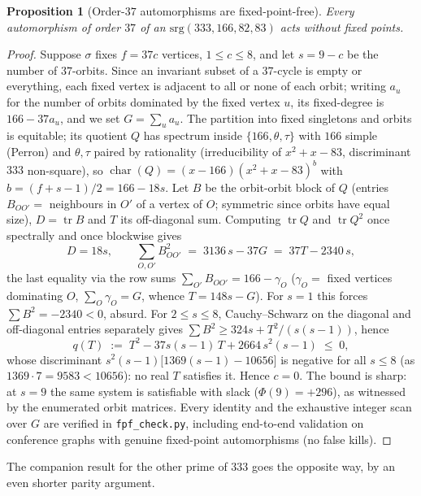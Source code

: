 \documentclass[11pt]{article}
\newtheorem{proposition}{Proposition}
\theoremstyle{definition}
\begin{document}
\begin{proposition}[Order-$37$ automorphisms are fixed-point-free]\label{prop:fpf}
Every automorphism of order $37$ of an $\mathrm{srg}(333,166,82,83)$ acts without fixed points.
\end{proposition}
\begin{proof}
Suppose $\sigma$ fixes $f=37c$ vertices, $1\le c\le 8$, and let $s=9-c$ be the number of
$37$-orbits. Since an invariant subset of a $37$-cycle is empty or everything, each fixed vertex is
adjacent to all or none of each orbit; writing $a_u$ for the number of orbits dominated by the fixed
vertex $u$, its fixed-degree is $166-37a_u$, and we set $G=\sum_u a_u$. The partition into fixed
singletons and orbits is equitable; its quotient $Q$ has spectrum inside
$\{166,\theta,\tau\}$ with $166$ simple (Perron) and $\theta,\tau$ paired by rationality
(irreducibility of $x^2+x-83$, discriminant $333$ non-square), so
$\operatorname{char}(Q)=(x-166)(x^2+x-83)^{b}$ with $b=(f+s-1)/2=166-18s$. Let $B$ be the
orbit-orbit block of $Q$ (entries $B_{OO'}=$ neighbours in $O'$ of a vertex of $O$; symmetric since
orbits have equal size), $D=\operatorname{tr}B$ and $T$ its off-diagonal sum. Computing
$\operatorname{tr}Q$ and $\operatorname{tr}Q^2$ once spectrally and once blockwise gives
\[
D=18s,\qquad \textstyle\sum_{O,O'}B_{OO'}^2 \;=\; 3136\,s-37G \;=\; 37T-2340\,s,
\]
the last equality via the row sums $\sum_{O'}B_{OO'}=166-\gamma_O$ ($\gamma_O=$ fixed vertices
dominating $O$, $\sum_O\gamma_O=G$, whence $T=148s-G$). For $s=1$ this forces
$\sum B^2=-2340<0$, absurd. For $2\le s\le 8$, Cauchy--Schwarz on the diagonal and off-diagonal
entries separately gives $\sum B^2\ge 324s+T^2/(s(s-1))$, hence
\[
q(T)\;:=\;T^2-37s(s-1)\,T+2664\,s^2(s-1)\;\le\;0,
\]
whose discriminant $s^2(s-1)\bigl[1369(s-1)-10656\bigr]$ is negative for all $s\le 8$ (as
$1369\cdot7=9583<10656$): no real $T$ satisfies it. Hence $c=0$. The bound is sharp: at $s=9$ the
same system is satisfiable with slack ($\Phi(9)=+296$), as witnessed by the enumerated orbit
matrices. Every identity and the exhaustive integer scan over $G$ are verified in
\texttt{fpf\_check.py}, including end-to-end validation on conference graphs with genuine
fixed-point automorphisms (no false kills).
\end{proof}

The companion result for the other prime of $333$ goes the opposite way, by an even shorter
parity argument.
\end{document}
